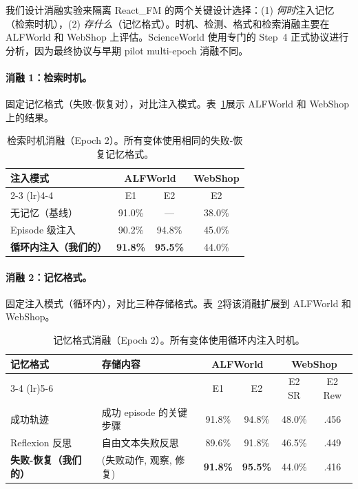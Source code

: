 \documentclass[11pt,a4paper]{article}
\newcommand{\method}{React\_FM}
\begin{document}
我们设计消融实验来隔离 \method{} 的两个关键设计选择：(1) \emph{何时}注入记忆（检索时机），(2) \emph{存什么}（记忆格式）。时机、检测、格式和检索消融主要在 ALFWorld 和 WebShop 上评估。ScienceWorld 使用专门的 Step~4 正式协议进行分析，因为最终协议与早期 pilot multi-epoch 消融不同。

\paragraph{消融 1：检索时机。}
固定记忆格式（失败-恢复对），对比注入模式。表~\ref{tab:ablation_timing}展示 ALFWorld 和 WebShop 上的结果。

\begin{table}[h]
\centering
\caption{检索时机消融（Epoch 2）。所有变体使用相同的失败-恢复记忆格式。}
\label{tab:ablation_timing}
\small
\begin{tabular}{lccc}
\toprule
\multirow{2}{*}{注入模式} & \multicolumn{2}{c}{ALFWorld} & WebShop \\
\cmidrule(lr){2-3} \cmidrule(lr){4-4}
 & E1 & E2 & E2 \\
\midrule
无记忆（基线） & 91.0\% & --- & 38.0\% \\
Episode 级注入 & 90.2\% & 94.8\% & 45.0\% \\
\textbf{循环内注入（我们的）} & \textbf{91.8\%} & \textbf{95.5\%} & 44.0\% \\
\bottomrule
\end{tabular}
\end{table}

\paragraph{消融 2：记忆格式。}
固定注入模式（循环内），对比三种存储格式。表~\ref{tab:ablation_format}将该消融扩展到 ALFWorld 和 WebShop。

\begin{table}[h]
\centering
\caption{记忆格式消融（Epoch 2）。所有变体使用循环内注入时机。}
\label{tab:ablation_format}
\small
\begin{tabular}{lp{3cm}cccc}
\toprule
\multirow{2}{*}{记忆格式} & \multirow{2}{*}{存储内容} & \multicolumn{2}{c}{ALFWorld} & \multicolumn{2}{c}{WebShop} \\
\cmidrule(lr){3-4} \cmidrule(lr){5-6}
 & & E1 & E2 & E2 SR & E2 Rew \\
\midrule
成功轨迹 & 成功 episode 的关键步骤 & 91.8\% & 94.8\% & 48.0\% & .456 \\
Reflexion 反思 & 自由文本失败反思 & 89.6\% & 91.8\% & 46.5\% & .449 \\
\textbf{失败-恢复（我们的）} & (失败动作, 观察, 修复) & \textbf{91.8\%} & \textbf{95.5\%} & 44.0\% & .416 \\
\bottomrule
\end{tabular}
\end{table}
\end{document}
